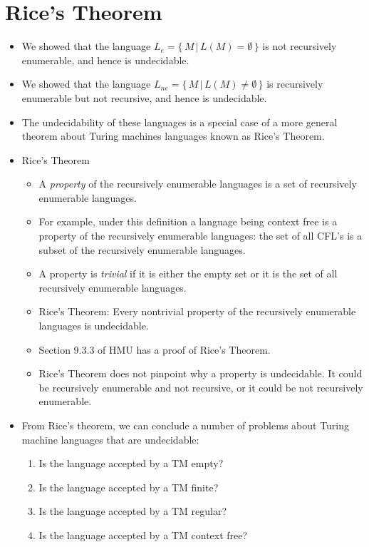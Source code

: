 \documentclass[]{article}
\begin{document}
\section{Rice's Theorem}
\begin{itemize}
\item We showed that the language $L_e = \{\,M\,|\,L(M) = \emptyset\,\}$ is not
recursively enumerable, and hence is undecidable.
\item We showed that the language $L_{ne} = \{\,M\,|\,L(M) \neq \emptyset\,\}$
is recursively enumerable but not recursive, and hence is undecidable.
\item The undecidability of these languages is a special case of a more general
theorem about Turing machines languages known as Rice's Theorem.
\item Rice's Theorem
\begin{itemize}
\item A \emph{property} of the recursively enumerable languages is a set of
recursively enumerable languages.
\item For example, under this definition a language being context free is a
property of the recursively enumerable languages: the set of all CFL's is a
subset of the recursively enumerable languages.
\item A property is \emph{trivial} if it is either the empty set or it is the
set of all recursively enumerable languages.
\item Rice's Theorem: Every nontrivial property of the recursively enumerable
languages is undecidable.
\item Section 9.3.3 of HMU has a proof of Rice's Theorem.
\item Rice's Theorem does not pinpoint why a property is undecidable. It could
be recursively enumerable and not recursive, or it could be not recursively
enumerable.
\end{itemize}
\item From Rice's theorem, we can conclude a number of problems about Turing
machine languages that are undecidable:
\begin{enumerate}
\item Is the language accepted by a TM empty?
\item Is the language accepted by a TM finite?
\item Is the language accepted by a TM regular?
\item Is the language accepted by a TM context free?
\end{enumerate}
\end{itemize}
\end{document}
